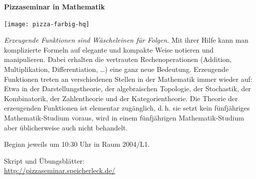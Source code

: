\documentclass[a4paper,ngerman,landscape,12pt]{scrartcl}
\begin{document}
\begin{center}
  \Huge
  \textbf{\sf Pizzaseminar in Mathematik}

  \texttt{[image: pizza-farbig-hq]}

  \vspace{1em}
  \large
  \begin{minipage}{0.95\textwidth}
    \setlength\parskip{\medskipamount}
    \setlength\columnsep{1.5cm}
    \begin{multicols}{2}
\emph{Erzeugende Funktionen sind Wäscheleinen für Folgen.}
Mit ihrer Hilfe kann man komplizierte Formeln auf elegante und kompakte
Weise notieren und manipulieren. Dabei erhalten die vertrauten
Rechenoperationen (Addition, Multiplikation, Differentiation,
\ldots) eine ganz neue Bedeutung.
Erzeugende Funktionen treten an verschiedenen Stellen in
der Mathematik immer wieder auf: Etwa in der Darstellungstheorie, der
algebraischen Topologie, der Stochastik, der Kombinatorik, der
Zahlentheorie und der
Kategorientheorie. Die Theorie der erzeugenden
Funktionen ist elementar
zugänglich, d.\,h. sie setzt kein
fünfjähriges Mathematik-Studium voraus,
wird in einem
fünfjährigen Mathematik-Studium aber
üblicherweise auch nicht behandelt.

Beginn jeweils um 10:30 Uhr in Raum 2004/L1.

Skript und Übungsblätter: \\
\url{http://pizzaseminar.speicherleck.de/}
\end{multicols}
\newpage
  \end{minipage}


\end{center}
\end{document}
